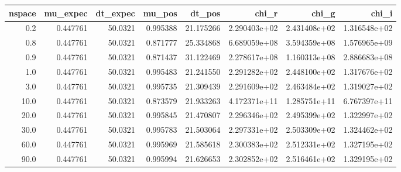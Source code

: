 \begin{tabular}{rrrrrrrr}
\toprule
 nspace &  mu\_expec &  dt\_expec &    mu\_pos &     dt\_pos &         chi\_r &         chi\_g &         chi\_i \\
\midrule
    0.2 &  0.447761 &   50.0321 &  0.995388 &  21.175266 &  2.290403e+02 &  2.431408e+02 &  1.316548e+02 \\
    0.8 &  0.447761 &   50.0321 &  0.871777 &  25.334868 &  6.689059e+08 &  3.594359e+08 &  1.576965e+09 \\
    0.9 &  0.447761 &   50.0321 &  0.871437 &  31.122469 &  2.278617e+08 &  1.160313e+08 &  2.886683e+08 \\
    1.0 &  0.447761 &   50.0321 &  0.995483 &  21.241550 &  2.291282e+02 &  2.448100e+02 &  1.317676e+02 \\
    3.0 &  0.447761 &   50.0321 &  0.995735 &  21.309439 &  2.291609e+02 &  2.463484e+02 &  1.319027e+02 \\
   10.0 &  0.447761 &   50.0321 &  0.873579 &  21.933263 &  4.172371e+11 &  1.285751e+11 &  6.767397e+11 \\
   20.0 &  0.447761 &   50.0321 &  0.995845 &  21.470807 &  2.296346e+02 &  2.495399e+02 &  1.322997e+02 \\
   30.0 &  0.447761 &   50.0321 &  0.995783 &  21.503064 &  2.297331e+02 &  2.503309e+02 &  1.324462e+02 \\
   60.0 &  0.447761 &   50.0321 &  0.995969 &  21.585618 &  2.300383e+02 &  2.512331e+02 &  1.327195e+02 \\
   90.0 &  0.447761 &   50.0321 &  0.995994 &  21.626653 &  2.302852e+02 &  2.516461e+02 &  1.329195e+02 \\
\bottomrule
\end{tabular}
